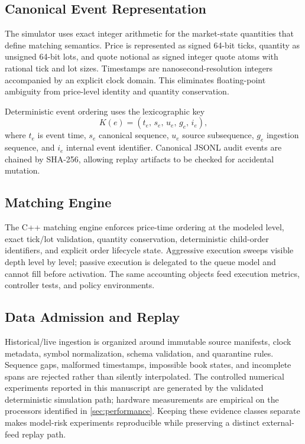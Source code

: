 \documentclass[journal,10pt]{IEEEtran}
\newcommand{\1}{\mathbf{1}}
\begin{document}
\subsection{Canonical Event Representation}
The simulator uses exact integer arithmetic for the market-state quantities that define matching semantics. Price is represented as signed 64-bit ticks, quantity as unsigned 64-bit lots, and quote notional as signed integer quote atoms with rational tick and lot sizes. Timestamps are nanosecond-resolution integers accompanied by an explicit clock domain. This eliminates floating-point ambiguity from price-level identity and quantity conservation.

Deterministic event ordering uses the lexicographic key
\begin{equation}
K(e)=(t_e,\,s_e,\,u_e,\,g_e,\,i_e),
\label{eq:event-key}
\end{equation}
where $t_e$ is event time, $s_e$ canonical sequence, $u_e$ source subsequence, $g_e$ ingestion sequence, and $i_e$ internal event identifier. Canonical JSONL audit events are chained by SHA-256, allowing replay artifacts to be checked for accidental mutation.

\subsection{Matching Engine}
The C++ matching engine enforces price-time ordering at the modeled level, exact tick/lot validation, quantity conservation, deterministic child-order identifiers, and explicit order lifecycle state. Aggressive execution sweeps visible depth level by level; passive execution is delegated to the queue model and cannot fill before activation. The same accounting objects feed execution metrics, controller tests, and policy environments.

\subsection{Data Admission and Replay}
Historical/live ingestion is organized around immutable source manifests, clock metadata, symbol normalization, schema validation, and quarantine rules. Sequence gaps, malformed timestamps, impossible book states, and incomplete spans are rejected rather than silently interpolated. The controlled numerical experiments reported in this manuscript are generated by the validated deterministic simulation path; hardware measurements are empirical on the processors identified in \cref{sec:performance}. Keeping these evidence classes separate makes model-risk experiments reproducible while preserving a distinct external-feed replay path.
\end{document}
